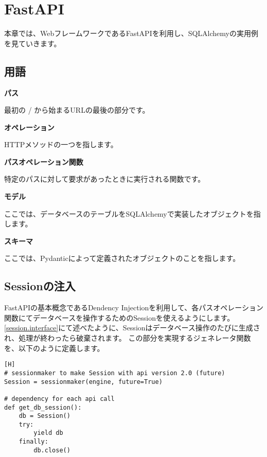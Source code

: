 \chapter{FastAPI}

本章では、WebフレームワークであるFastAPIを利用し、SQLAlchemyの実用例を見ていきます。

\section{用語}

\begin{dfn}
  \textbf{パス}
\end{dfn}
最初の / から始まるURLの最後の部分です。

\begin{dfn}
  \label{operation}
  \textbf{オペレーション}
\end{dfn}
HTTPメソッドの一つを指します。

\begin{dfn}
  \textbf{パスオペレーション関数}
\end{dfn}
特定のパスに対して要求があったときに実行される関数です。

\begin{dfn}
  \textbf{モデル}
\end{dfn}
ここでは、データベースのテーブルをSQLAlchemyで実装したオブジェクトを指します。

\begin{dfn}
  \textbf{スキーマ}
\end{dfn}
ここでは、Pydanticによって定義されたオブジェクトのことを指します。



\section{Sessionの注入}
FastAPIの基本概念であるDendency Injectionを利用して、各パスオペレーション関数にてデータベースを操作するためのSessionを使えるようにします。
\ref{session.interface}にて述べたように、Sessionはデータベース操作のたびに生成され、処理が終わったら破棄されます。
この部分を実現するジェネレータ関数を、以下のように定義します。

\begin{lstlisting}[caption=セッションジェネレータ][H]
# sessionmaker to make Session with api version 2.0 (future)
Session = sessionmaker(engine, future=True)

# dependency for each api call
def get_db_session():
    db = Session()
    try:
        yield db
    finally:
        db.close()
\end{lstlisting}

